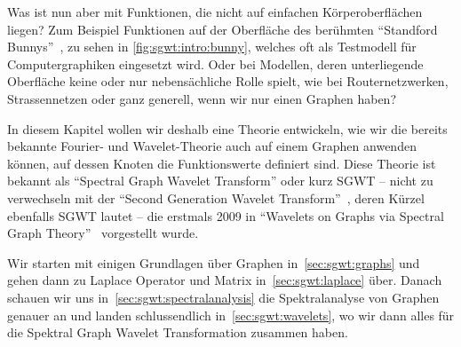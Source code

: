 Was ist nun aber mit Funktionen, die nicht auf einfachen K\"orperoberfl\"achen 
liegen? Zum Beispiel Funktionen auf der Oberfl\"ache des ber\"uhmten 
``Standford Bunnys''~\cite{noauthor_stanford_nodate}, zu sehen in 
\cref{fig:sgwt:intro:bunny}, welches oft als Testmodell f\"ur Computergraphiken 
eingesetzt wird. Oder bei Modellen, deren unterliegende Oberfl\"ache keine oder 
nur nebens\"achliche Rolle spielt, wie bei Routernetzwerken, Strassennetzen 
oder ganz generell, wenn wir nur einen Graphen haben?

In diesem Kapitel wollen wir deshalb eine Theorie entwickeln, wie 
wir die bereits bekannte Fourier- und Wavelet-Theorie auch auf einem Graphen 
anwenden 
k\"onnen, auf dessen Knoten die Funktionswerte definiert sind. Diese Theorie 
ist bekannt als ``Spectral Graph Wavelet Transform'' oder kurz SGWT -- nicht zu 
verwechseln mit der ``Second Generation Wavelet 
Transform''~\cite{noauthor_second-generation_2018}, deren K\"urzel ebenfalls 
SGWT lautet -- die erstmals 2009 in ``Wavelets on Graphs via Spectral Graph 
Theory''~\cite{hammond_wavelets_2009} vorgestellt wurde.

Wir starten mit einigen Grundlagen \"uber Graphen in~\cref{sec:sgwt:graphs} und 
gehen dann zu Laplace Operator und Matrix in~\cref{sec:sgwt:laplace} \"uber. 
Danach schauen wir uns in~\cref{sec:sgwt:spectralanalysis} die Spektralanalyse 
von Graphen genauer an und landen schlussendlich in~\cref{sec:sgwt:wavelets}, 
wo wir dann alles f\"ur die Spektral Graph Wavelet Transformation zusammen 
haben.
